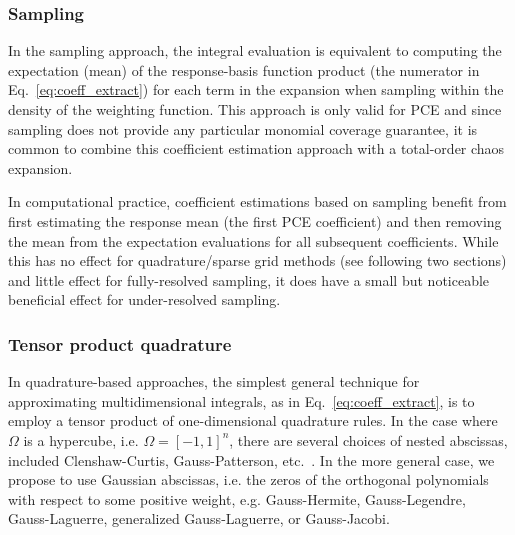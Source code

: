 \subsubsection{Sampling} \label{uq:expansion:spectral_samp}

In the sampling approach, the integral evaluation is equivalent to
computing the expectation (mean) of the response-basis function
product (the numerator in Eq.~\ref{eq:coeff_extract}) for each term in
the expansion when sampling within the density of the weighting
function.  This approach is only valid for PCE and since sampling does
not provide any particular monomial coverage guarantee, it is common
to combine this coefficient estimation approach with a total-order
chaos expansion.

In computational practice, coefficient estimations based on sampling
benefit from first estimating the response mean (the first PCE
coefficient) and then removing the mean from the expectation
evaluations for all subsequent coefficients.  While this has no effect
for quadrature/sparse grid methods (see following two sections) and
little effect for fully-resolved sampling, it does have a small but
noticeable beneficial effect for under-resolved sampling.


\subsubsection{Tensor product quadrature} \label{uq:expansion:spectral_quad}

In quadrature-based approaches, the simplest general technique for
approximating multidimensional integrals, as in
Eq.~\ref{eq:coeff_extract}, is to employ a tensor product of
one-dimensional quadrature rules.  In the case where $\Omega$ is a
hypercube, i.e. $\Omega=[-1,1]^n$, there are several choices of nested
abscissas, included Clenshaw-Curtis, Gauss-Patterson,
etc.~\cite{webster1, webster2, gerstner_griebel_98}.  In the more
general case, we propose to use Gaussian abscissas, i.e. the zeros of
the orthogonal polynomials with respect to some positive weight,
e.g. Gauss-Hermite, Gauss-Legendre, Gauss-Laguerre, generalized
Gauss-Laguerre, or Gauss-Jacobi.

